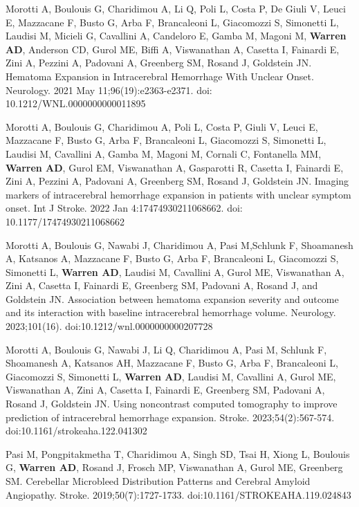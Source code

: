 \documentclass[10pt]{article} %
\begin{document}
\begin{thebibliography}{99}
 Morotti A, Boulouis G, Charidimou A, Li Q, Poli L, Costa P, De Giuli V, Leuci E, Mazzacane F, Busto G, Arba F, Brancaleoni L, Giacomozzi S, Simonetti L, Laudisi M, Micieli G, Cavallini A, Candeloro E, Gamba M, Magoni M, \textbf{Warren AD}, Anderson CD, Gurol ME, Biffi A, Viswanathan A, Casetta I, Fainardi E, Zini A, Pezzini A, Padovani A, Greenberg SM, Rosand J, Goldstein JN. Hematoma Expansion in Intracerebral Hemorrhage With Unclear Onset. Neurology. 2021 May 11;96(19):e2363-e2371. doi: 10.1212/WNL.0000000000011895

 Morotti A, Boulouis G, Charidimou A, Poli L, Costa P, Giuli V, Leuci E, Mazzacane F, Busto G, Arba F, Brancaleoni L, Giacomozzi S, Simonetti L, Laudisi M, Cavallini A, Gamba M, Magoni M, Cornali C, Fontanella MM, \textbf{Warren AD}, Gurol EM, Viswanathan A, Gasparotti R, Casetta I, Fainardi E, Zini A, Pezzini A, Padovani A, Greenberg SM, Rosand J, Goldstein JN. Imaging markers of intracerebral hemorrhage expansion in patients with unclear symptom onset. Int J Stroke. 2022 Jan 4:17474930211068662. doi: 10.1177/17474930211068662

 Morotti A, Boulouis G, Nawabi J, Charidimou A, Pasi M,Schlunk F, Shoamanesh A, Katsanos A, Mazzacane F, Busto G, Arba F, Brancaleoni L, Giacomozzi S, Simonetti L, \textbf{Warren AD}, Laudisi M, Cavallini A, Gurol ME, Viswanathan A, Zini A, Casetta I, Fainardi E, Greenberg SM, Padovani A, Rosand J, and Goldstein JN. Association between hematoma expansion severity and outcome and its interaction with baseline intracerebral hemorrhage volume. Neurology. 2023;101(16). doi:10.1212/wnl.0000000000207728

 Morotti A, Boulouis G, Nawabi J, Li Q, Charidimou A, Pasi M, Schlunk F, Shoamanesh A, Katsanos AH, Mazzacane F, Busto G, Arba F, Brancaleoni L, Giacomozzi S, Simonetti L, \textbf{Warren AD}, Laudisi M, Cavallini A, Gurol ME, Viswanathan A, Zini A, Casetta I, Fainardi E, Greenberg SM, Padovani A, Rosand J, Goldstein JN. Using noncontrast computed tomography to improve prediction of intracerebral hemorrhage expansion. Stroke. 2023;54(2):567-574. doi:10.1161/strokeaha.122.041302

 Pasi M, Pongpitakmetha T, Charidimou A, Singh SD, Tsai H, Xiong L, Boulouis G, \textbf{Warren AD}, Rosand J, Frosch MP, Viswanathan A, Gurol ME, Greenberg SM. Cerebellar Microbleed Distribution Patterns and Cerebral Amyloid Angiopathy. Stroke. 2019;50(7):1727-1733. doi:10.1161/STROKEAHA.119.024843


\end{thebibliography}
\end{document}
